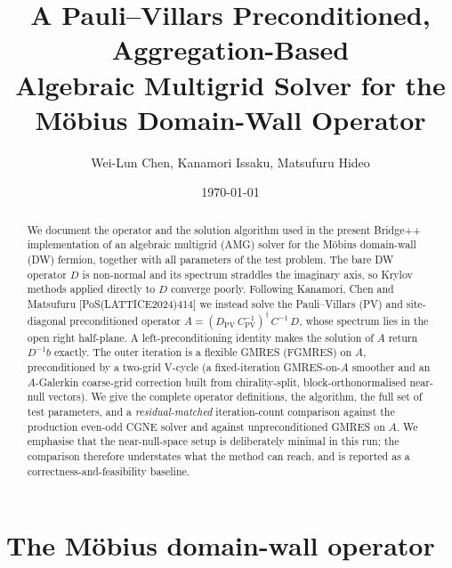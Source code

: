 \documentclass[12pt,a4paper]{article}
\title{\textbf{A Pauli--Villars Preconditioned, Aggregation-Based\\
Algebraic Multigrid Solver for the M\"obius Domain-Wall Operator}}
\author{Wei-Lun Chen, Kanamori Issaku, Matsufuru Hideo}
\affil{\small (working note, Bridge++ \texttt{with\_alpha} branch)}
\date{\today}
\newcommand{\Ddw}{D}
\newcommand{\Dpv}{D_{\mathrm{PV}}}
\newcommand{\Cinv}{C^{-1}}
\newcommand{\Cpvinv}{C_{\mathrm{PV}}^{-1}}
\newcommand{\Aop}{A}
\newcommand{\dg}{^{\dagger}}
\begin{document}
\maketitle

\begin{abstract}
We document the operator and the solution algorithm used in the present
Bridge++ implementation of an algebraic multigrid (AMG) solver for the M\"obius
domain-wall (DW) fermion, together with all parameters of the test problem. The
bare DW operator $\Ddw$ is non-normal and its spectrum straddles the imaginary
axis, so Krylov methods applied directly to $\Ddw$ converge poorly. Following
Kanamori, Chen and Matsufuru [PoS(LATTICE2024)414] we instead solve the
Pauli--Villars (PV) and site-diagonal preconditioned operator
$\Aop=(\Dpv\,\Cpvinv)\dg\,\Cinv\,\Ddw$, whose spectrum lies in the open right
half-plane. A left-preconditioning identity makes the solution of
$\Aop$ return $\Ddw^{-1}b$ exactly. The outer iteration is a flexible GMRES
(FGMRES) on $\Aop$, preconditioned by a two-grid V-cycle (a fixed-iteration
GMRES-on-$\Aop$ smoother and an $\Aop$-Galerkin coarse-grid correction
built from chirality-split, block-orthonormalised near-null vectors). We give the
complete operator definitions,
the algorithm, the full set of test parameters, and a \emph{residual-matched}
iteration-count comparison against the production even-odd CGNE solver and against
unpreconditioned GMRES on $\Aop$. We emphasise that the near-null-space setup is
deliberately minimal in this run; the comparison therefore understates what the
method can reach, and is reported as a correctness-and-feasibility baseline.
\end{abstract}

\section{The M\"obius domain-wall operator}
\label{sec:operator}
\end{document}
